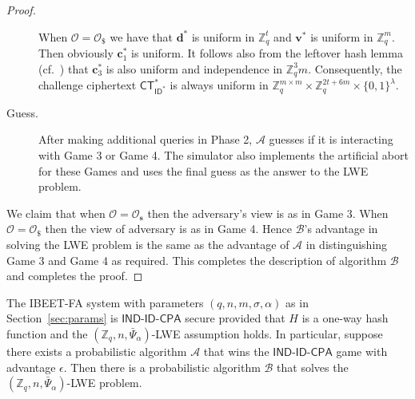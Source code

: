 \documentclass[runningheads,10pt]{llncs}
\def\ZZ{\mathbb{Z}}
\def\cal{\mathcal}
\def\bf{\mathbf}
\def\CT{\mathsf{CT}}
\def\IND{\textsf{IND-ID-CPA}}
\def\a{\alpha}
\def\v{\bf{v}}
\def\s{\bf{s}}
\def\c{\bf{c}}
\def\ID{\mathsf{ID}}
\begin{document}
\begin{proof}
\begin{description}
		When $\cal{O}=\cal{O}_{\$}$ we have that $\bf{d}^*$ is uniform in $\ZZ_q^t$ and $\v^*$ is uniform in $\ZZ_q^m$. Then obviously $\c_1^*$ is uniform. It follows also from the leftover hash lemma (cf.~{\cite[Theorem 8.38]{Shoup}}) that $\c_3^*$ is also uniform and independence in $\ZZ_q^3m$. Consequently, the challenge ciphertext $\CT_{\ID^*}^*$ is always uniform in $\ZZ_q^{m \times m} \times \ZZ_q^{2t+6m} \times \{0,1\}^\lambda$.\\
		
		\item[Guess.] After making additional queries in Phase 2, $\cal{A}$ guesses if it is interacting with Game 3 or Game 4. The simulator also implements the artificial abort for these Games and uses the final guess as the answer to the LWE problem.
	\end{description}
	
	We claim that when $\cal{O}=\cal{O}_\s$ then the adversary's view is as in Game 3. When $\cal{O}=\cal{O}_\$$ then the view of adversary is as in Game 4. Hence $\cal{B}$'s advantage in solving the LWE problem is the same as the advantage of $\cal{A}$ in distinguishing Game 3 and Game 4 as required. This completes the description of algorithm $\cal{B}$ and completes the proof.
\end{proof}



\begin{theorem}\label{thm:IND}
	The IBEET-FA system with parameters $(q,n,m,\sigma,\alpha)$ as in Section~\eqref{sec:params}  is $\IND$ secure provided that $H$ is a one-way hash function and the $(\ZZ_q,n,\bar\Psi_\a)$-LWE assumption holds. 
	In particular, suppose there exists a probabilistic algorithm $\cal{A}$ that wins the $\IND$ game with advantage $\epsilon$. Then there is a probabilistic algorithm $\cal{B}$ that solves the $(\ZZ_q,n,\bar\Psi_\a)$-LWE problem. 
\end{theorem}
\end{document}
